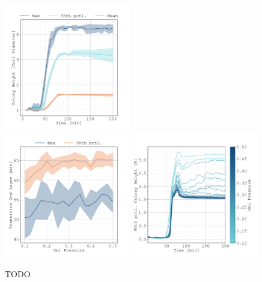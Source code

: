 \documentclass{article}
\begin{document}
\cite{You2019}

\begin{figure}[H]
    \centering
    \includegraphics[width=0.49\textwidth]
        {docs/source/_static/scripts/crm_multilayer/multilayer-time-evolution.pdf}\\
    \includegraphics[width=0.49\textwidth]
        {docs/source/_static/scripts/crm_multilayer/colony-height-vs-gel_pressure.pdf}
    \includegraphics[width=0.49\textwidth]
        {docs/source/_static/scripts/crm_multilayer/colony-height-vs-time.pdf}
    \caption{TODO}
    \label{fig:multilayer}
\end{figure}
\end{document}
